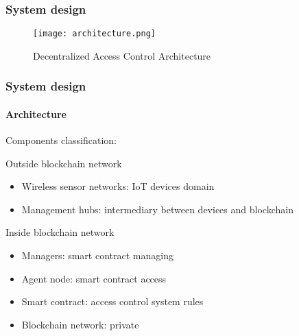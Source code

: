 \documentclass[
    aspectratio=169,                   %
]{beamer}
\begin{document}
    \begin{frame}
        \frametitle{System design}

            \begin{figure}
                \centering
                \begin{stampbox}
                    \texttt{[image: architecture.png]}
                \end{stampbox}
                \caption{Decentralized Access Control Architecture\cite{novo}}
            \end{figure}

        
    \end{frame}

    \begin{frame}
        \frametitle{System design}

        \paragraph{Architecture} Components classification:

        \begin{block}{Outside blockchain network}
            \begin{itemize}
                \item \alert{Wireless sensor networks}: IoT devices domain
                \item \alert{Management hubs}: intermediary between devices and blockchain
            \end{itemize}
        \end{block}

        \begin{block}{Inside blockchain network}
            \begin{itemize}
            \item \alert{Managers}: smart contract managing
            \item \alert{Agent node}: smart contract access
            \item \alert{Smart contract}: access control system rules
            \item \alert{Blockchain network}: private
            \end{itemize}
        \end{block}
    \end{frame}
\end{document}
